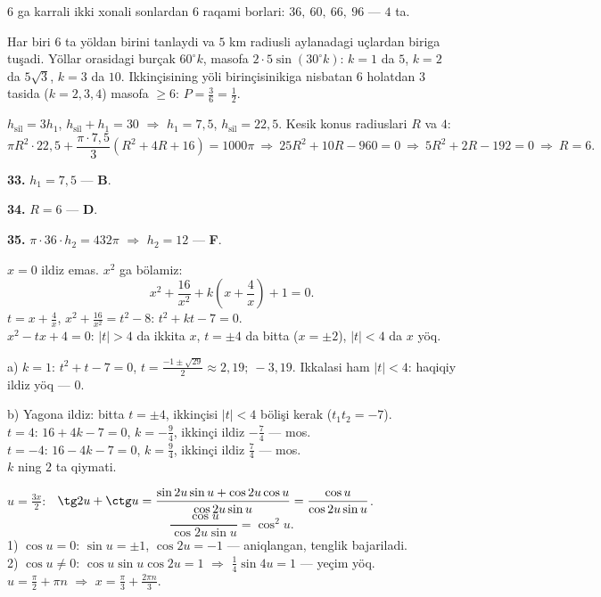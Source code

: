 $6$ ga karrali ikki xonali sonlardan $6$ raqami borlari: $36,\ 60,\ 66,\ 96$ — $4$ ta.

Har biri $6$ ta yöldan birini tanlaydi va $5$ km radiusli aylanadagi uçlardan biriga tuşadi. Yöllar orasidagi burçak $60^\circ k$, masofa $2\cdot5\sin(30^\circ k)$: $k=1$ da $5$, $k=2$ da $5\sqrt3$, $k=3$ da $10$. Ikkinçisining yöli birinçisinikiga nisbatan $6$ holatdan $3$ tasida ($k=2,3,4$) masofa $\ge6$:
$P=\frac36=\frac12$.

\newpage
{}
$h_{\text{sil}}=3h_1$, $h_{\text{sil}}+h_1=30$ $\Rightarrow$ $h_1=7{,}5$, $h_{\text{sil}}=22{,}5$. Kesik konus radiuslari $R$ va $4$:
\[\pi R^2\cdot22{,}5+\frac{\pi\cdot7{,}5}3\left(R^2+4R+16\right)=1000\pi\ \Rightarrow\ 25R^2+10R-960=0\ \Rightarrow\ 5R^2+2R-192=0\ \Rightarrow\ R=6.\]

\textbf{33.} $h_1=7{,}5$ — \textbf{B}.

\textbf{34.} $R=6$ — \textbf{D}.

\textbf{35.} $\pi\cdot36\cdot h_2=432\pi$ $\Rightarrow$ $h_2=12$ — \textbf{F}.

\newpage
{}
$x=0$ ildiz emas. $x^2$ ga bölamiz:
\[x^2+\frac{16}{x^2}+k\left(x+\frac4x\right)+1=0.\]
$t=x+\frac4x$, $x^2+\frac{16}{x^2}=t^2-8$: \qquad $t^2+kt-7=0$.\\
$x^2-tx+4=0$: $|t|>4$ da ikkita $x$, $t=\pm4$ da bitta ($x=\pm2$), $|t|<4$ da $x$ yöq.

a) $k=1$: $t^2+t-7=0$, $t=\frac{-1\pm\sqrt{29}}2\approx2{,}19;\ -3{,}19$. Ikkalasi ham $|t|<4$: haqiqiy ildiz yöq — $0$.

b) Yagona ildiz: bitta $t=\pm4$, ikkinçisi $|t|<4$ bölişi kerak ($t_1t_2=-7$).\\
$t=4$: $16+4k-7=0$, $k=-\frac94$, ikkinçi ildiz $-\frac74$ — mos.\\
$t=-4$: $16-4k-7=0$, $k=\frac94$, ikkinçi ildiz $\frac74$ — mos.\\
$k$ ning $2$ ta qiymati.

\newpage
{}
$u=\frac{3x}2$: \ $\tg2u+\ctg u=\dfrac{\sin2u\sin u+\cos2u\cos u}{\cos2u\sin u}=\dfrac{\cos u}{\cos2u\sin u}$.
\[\frac{\cos u}{\cos2u\sin u}=\cos^2u.\]
1) $\cos u=0$: $\sin u=\pm1$, $\cos2u=-1$ — aniqlangan, tenglik bajariladi.\\
2) $\cos u\ne0$: $\cos u\sin u\cos2u=1$ $\Rightarrow$ $\frac14\sin4u=1$ — yeçim yöq.\\
$u=\frac\pi2+\pi n$ $\Rightarrow$ $x=\frac\pi3+\frac{2\pi n}3$.

